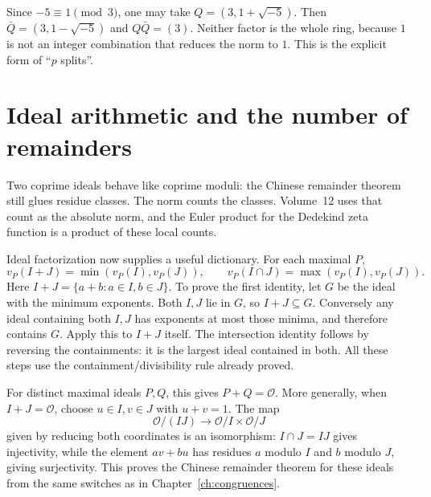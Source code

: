 \begin{examplex}
Since $-5\equiv 1\pmod 3$, one may take $Q=(3,1+\sqrt{-5})$. Then $\bar Q=(3,1-\sqrt{-5})$ and $Q\bar Q=(3)$. Neither factor is the whole ring, because $1$ is not an integer combination that reduces the norm to $1$. This is the explicit form of ``$p$ splits''.
\end{examplex}

\section{Ideal arithmetic and the number of remainders}

Two coprime ideals behave like coprime moduli: the Chinese remainder theorem still glues residue classes. The norm counts the classes. Volume~12 uses that count as the absolute norm, and the Euler product for the Dedekind zeta function is a product of these local counts.

Ideal factorization now supplies a useful dictionary. For each maximal $P$,
\[
v_P(I+J)=\min(v_P(I),v_P(J)),\qquad
v_P(I\cap J)=\max(v_P(I),v_P(J)).
\]
Here $I+J=\{a+b:a\in I,b\in J\}$.
To prove the first identity, let $G$ be the ideal with the minimum exponents.
Both $I,J$ lie in $G$, so $I+J\subseteq G$. Conversely any ideal containing
both $I,J$ has exponents at most those minima, and therefore contains $G$.
Apply this to $I+J$ itself. The intersection identity follows by reversing
the containments: it is the largest ideal contained in both.
All these steps use the containment/divisibility rule already proved.

For distinct maximal ideals $P,Q$, this gives $P+Q=\mathcal O$.
More generally, when $I+J=\mathcal O$, choose $u\in I,v\in J$
with $u+v=1$. The map
\[
\mathcal O/(IJ)\longrightarrow\mathcal O/I\times\mathcal O/J
\]
given by reducing both coordinates is an isomorphism:
$I\cap J=IJ$ gives injectivity, while the element $av+bu$
has residues $a$ modulo $I$ and $b$ modulo $J$, giving surjectivity.
This proves the Chinese remainder theorem for these ideals from the
same switches as in Chapter~\ref{ch:congruences}.

